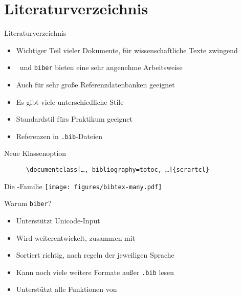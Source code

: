 \section{Literaturverzeichnis}

\begin{frame}[fragile]{Literaturverzeichnis}
  \begin{itemize}
    \item Wichtiger Teil vieler Dokumente, für wissenschaftliche Texte zwingend
    \item \BibLaTeX\ und \texttt{biber} bieten eine sehr angenehme Arbeitsweise
    \item Auch für sehr große Referenzdatenbanken geeignet
    \item Es gibt viele unterschiedliche Stile
    \item Standardstil fürs Praktikum geeignet
    \item Referenzen in \texttt{.bib}-Dateien
  \end{itemize}
  \begin{block}{Neue Klassenoption}
    \begin{verbatim}
      \documentclass[…, bibliography=totoc, …]{scrartcl}
    \end{verbatim}
  \end{block}
\end{frame}

\begin{frame}{Die \BibTeX-Familie}
  \centering
  \vspace{0.025\textheight}
  \texttt{[image: figures/bibtex-many.pdf]}
\end{frame}

\begin{frame}{Warum \texttt{biber}?}
  \begin{itemize}
    \item Unterstützt Unicode-Input
    \item Wird weiterentwickelt, zusammen mit \BibLaTeX
    \item Sortiert richtig, nach regeln der jeweiligen Sprache
    \item Kann noch viele weitere Formate außer \texttt{.bib} lesen
    \item Unterstützt alle Funktionen von \BibLaTeX
  \end{itemize}
\end{frame}

